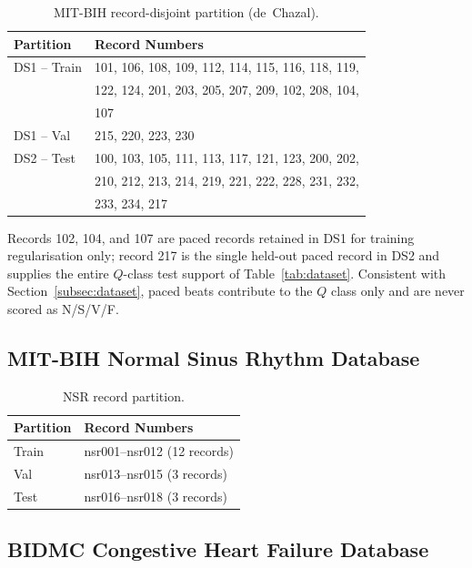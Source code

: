 \begin{table}[!t]
\centering
\caption{MIT-BIH record-disjoint partition (de~Chazal).}
\label{tab:mitbih_partition}
\begin{tabular}{@{}ll@{}}
\toprule
\textbf{Partition} & \textbf{Record Numbers} \\
\midrule
DS1 -- Train & 101, 106, 108, 109, 112, 114, 115, 116, 118, 119, \\
             & 122, 124, 201, 203, 205, 207, 209, 102, 208, 104, \\
             & 107 \\
DS1 -- Val   & 215, 220, 223, 230 \\
DS2 -- Test  & 100, 103, 105, 111, 113, 117, 121, 123, 200, 202, \\
             & 210, 212, 213, 214, 219, 221, 222, 228, 231, 232, \\
             & 233, 234, 217 \\
\bottomrule
\end{tabular}
\end{table}

\noindent
Records 102, 104, and 107 are paced records retained in DS1 for training
regularisation only; record 217 is the single held-out paced record in DS2
and supplies the entire $Q$-class test support of Table~\ref{tab:dataset}.
Consistent with Section~\ref{subsec:dataset}, paced beats contribute to the
$Q$ class only and are never scored as N/S/V/F.

\subsection{MIT-BIH Normal Sinus Rhythm Database}

\begin{table}[!t]
\centering
\caption{NSR record partition.}
\label{tab:nsr_partition}
\begin{tabular}{@{}ll@{}}
\toprule
\textbf{Partition} & \textbf{Record Numbers} \\
\midrule
Train  & nsr001--nsr012 (12 records) \\
Val    & nsr013--nsr015 (3 records)  \\
Test   & nsr016--nsr018 (3 records)  \\
\bottomrule
\end{tabular}
\end{table}

\subsection{BIDMC Congestive Heart Failure Database}

